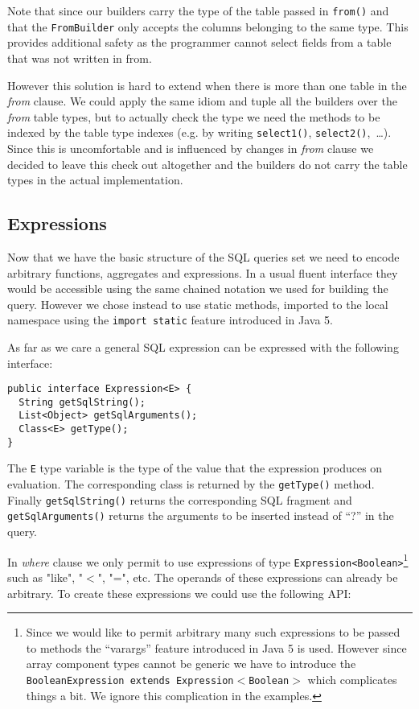 \documentclass{sig-alternate}
\begin{document}
Note that since our builders carry the type of the table passed in \verb!from()! and that the \verb!FromBuilder! only accepts the columns belonging to the same type. This provides additional safety as the programmer cannot select fields from a table that was not written in from.

However this solution is hard to extend when there is more than one table in the \emph{from} clause. We could apply the same idiom and tuple all the builders over the \emph{from} table types, but to actually check the type we need the methods to be indexed by the table type indexes (e.g. by writing \verb!select1()!, \verb!select2()!,~\ldots). Since this is uncomfortable and is influenced by changes in \emph{from} clause we decided to leave this check out altogether and the builders do not carry the table types in the actual implementation.

\subsection{Expressions}

Now that we have the basic structure of the SQL queries set we need to encode arbitrary functions, aggregates and expressions. In a usual fluent interface they would be accessible using the same chained notation we used for building the query. However we chose instead to use static methods, imported to the local namespace using the \verb!import static! feature introduced in Java 5.

As far as we care a general SQL expression can be expressed with the following interface:

\begin{verbatim}
public interface Expression<E> {
  String getSqlString();
  List<Object> getSqlArguments();
  Class<E> getType();		
}
\end{verbatim}

The \verb!E! type variable is the type of the value that the expression produces on evaluation. The corresponding class is returned by the \verb!getType()! method. Finally \verb!getSqlString()! returns the corresponding SQL fragment and \verb!getSqlArguments()! returns the arguments to be inserted instead of ``?'' in the query. 

In \emph{where} clause we only permit to use expressions of type \verb!Expression<Boolean>!\footnote{Since we would like to permit arbitrary many such expressions to be passed to methods the ``varargs'' feature introduced in Java 5 is used. However since array component types cannot be generic we have to introduce the \texttt{BooleanExpression extends Expression$<$Boolean$>$} which complicates things a bit. We ignore this complication in the examples.} such as "like", "$<$", "=", etc. The operands of these expressions can already be arbitrary. To create these expressions we could use the following API:
\end{document}
